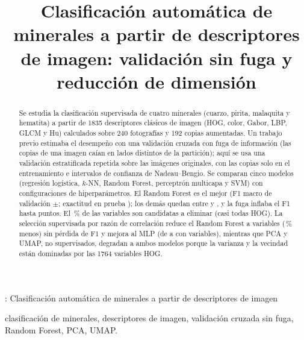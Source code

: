 \documentclass[journal]{IEEEtran}
\begin{document}
\title{Clasificación automática de minerales a partir de descriptores de imagen: validación sin fuga y reducción de dimensión}
\author{\IEEEauthorblockN{\AUTORES}
}
%
{\AUTORESCORTO: Clasificación automática de minerales a partir de descriptores de imagen}
\maketitle

\begin{abstract}
Se estudia la clasificación supervisada de cuatro minerales (cuarzo, pirita, malaquita y hematita) a partir de 1835 descriptores clásicos de imagen (HOG, color, Gabor, LBP, GLCM y Hu) calculados sobre 240 fotografías y 192 copias aumentadas. Un trabajo previo estimaba el desempeño con una validación cruzada con fuga de información (las copias de una imagen caían en lados distintos de la partición); aquí se usa una validación estratificada repetida sobre las imágenes originales, con las copias solo en el entrenamiento e intervalos de confianza de Nadeau--Bengio. Se comparan cinco modelos (regresión logística, $k$-NN, Random Forest, perceptrón multicapa y SVM) con  configuraciones de hiperparámetros. El Random Forest es el mejor (F1 macro de validación $\pm$; exactitud en prueba ); los demás quedan entre  y , y la fuga inflaba el F1 hasta  puntos. El \,\% de las variables son candidatas a eliminar (casi todas HOG). La selección supervisada por razón de correlación reduce el Random Forest a  variables (\,\% menos) sin pérdida de F1 y mejora al MLP (de  a  con  variables), mientras que PCA y UMAP, no supervisados, degradan a ambos modelos porque la varianza y la vecindad están dominadas por las 1764 variables HOG.
\end{abstract}
\begin{IEEEkeywords}
clasificación de minerales, descriptores de imagen, validación cruzada sin fuga, Random Forest, PCA, UMAP.
\end{IEEEkeywords}

\end{document}
